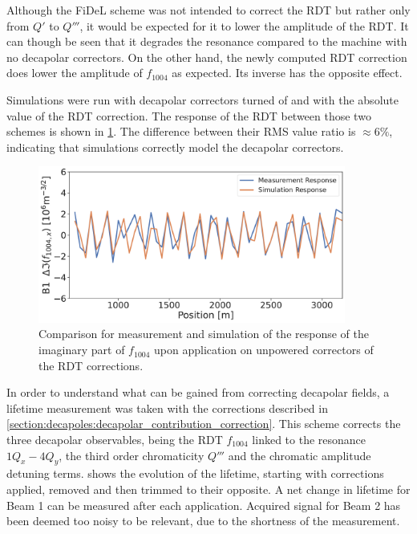 Although the FiDeL scheme was not intended to correct the RDT but rather only from $Q'$ to $Q'''$,
it would be expected for it to lower the amplitude of the RDT. It can though be seen that it
degrades the resonance compared to the machine with no decapolar correctors. On the other hand, the
newly computed RDT correction does lower the amplitude of $f_{1004}$ as expected.  Its inverse has
the opposite effect.

Simulations were run with decapolar correctors turned of and with the absolute value of the RDT
correction. The response of the RDT between those two schemes is shown in 
\cref{fig:decapoles:rdt:b1_response_corr}. The difference between their RMS value ratio is $\approx
6\%$, indicating that simulations correctly model the decapolar correctors.

\begin{figure}[!htb]
    \centering
    \includegraphics[width=0.9\textwidth]{./images/f1004/b1_response_rdt_corr.pdf}
    \caption{Comparison for measurement and simulation of the response of the imaginary part of
    $f_{1004}$ upon application on unpowered correctors of the RDT corrections.}
    \label{fig:decapoles:rdt:b1_response_corr}
\end{figure}


In order to understand what can be gained from correcting decapolar fields, a lifetime measurement
was taken with the corrections described in 
\cref{section:decapoles:decapolar_contribution_correction}. This scheme corrects the three decapolar 
observables, being the RDT $f_{1004}$ linked to the resonance $1Q_x - 4Q_y$, the third order
chromaticity $Q'''$ and the chromatic amplitude detuning terms.
 shows the evolution of the lifetime, starting with
corrections applied, removed and then trimmed to their opposite. A net change in lifetime for Beam 1
can be measured after each application. Acquired signal for Beam 2 has been deemed too noisy to be 
relevant, due to the shortness of the measurement.


